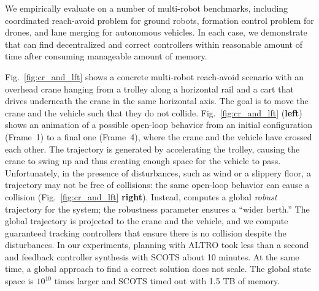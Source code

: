 We empirically evaluate \tool on a number of multi-robot benchmarks, including coordinated reach-avoid problem for ground robots, formation control problem for drones, and lane merging for autonomous vehicles.
In each case, we demonstrate that \tool can find decentralized and correct controllers within reasonable amount of time after consuming manageable amount of memory.

Fig.~\ref{fig:cr_and_lft} shows a concrete multi-robot reach-avoid scenario with an overhead crane hanging from a trolley along a horizontal rail
and a cart that drives underneath the crane in the same horizontal axis.
The goal is to move the crane and the vehicle such that they do not collide.
Fig.~\ref{fig:cr_and_lft} (\textbf{left}) shows an animation of a possible open-loop behavior from an initial configuration (Frame~1) to a final
one (Frame~4), where the crane and the vehicle have crossed each other.
The trajectory is generated by accelerating the trolley, causing the crane to swing up and thus creating enough space for the vehicle to pass.
Unfortunately, in the presence of disturbances, such as wind or a slippery floor, a trajectory may not be free of collisions: the same open-loop
behavior can cause a collision (Fig.~\ref{fig:cr_and_lft} \textbf{right}).
Instead, \tool computes a global \emph{robust} trajectory for the system; the robustness parameter ensures a ``wider berth.''
The global trajectory is projected to the crane and the vehicle, and we compute guaranteed tracking controllers that ensure there is no collision despite the disturbances.
In our experiments, planning with ALTRO took less than a second and feedback controller synthesis with SCOTS about 10 minutes.
At the same time, a global approach to find a correct solution does not scale. 
The global state space is $10^{10}$ times larger and SCOTS timed out with 1.5 TB of memory. 


